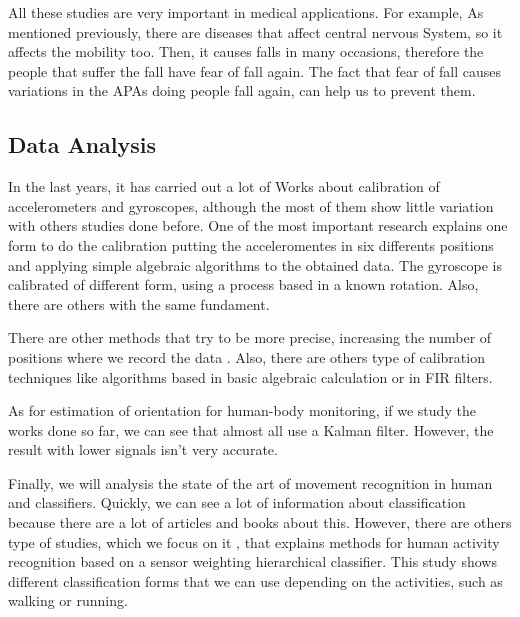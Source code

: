 All these studies are very important in medical applications. For example, As mentioned previously, there are diseases that affect central nervous System, so it affects  the mobility too. Then, it causes falls in many occasions, therefore  the people that suffer the fall have fear of fall again. The fact that fear of fall causes variations in the APAs doing people  fall again, can help us to prevent them.

\subsection{Data Analysis}

In the last years, it has carried out a lot of Works about  calibration of accelerometers and gyroscopes, although the most of them show little variation with others studies done before. One of the most important research  \cite{Kian2011}explains one form to do the calibration putting the acceleromentes in six differents positions and applying  simple algebraic algorithms to the obtained data. The gyroscope is calibrated of different form, using a process based in a known rotation. Also, there are others with the same fundament.

There are other methods that try to be more precise, increasing the number of positions where we record the data \cite{Camps2009}. Also, there are others type of calibration techniques like algorithms based in basic algebraic calculation or in FIR filters. \cite{A.Olivares2013}

As for estimation of orientation for human-body monitoring, if we study the works done so far, we can see that almost all  use a Kalman filter. However, the result with lower signals isn’t very accurate.\cite{A.Olivares2013}

Finally, we will analysis the state of the art of movement recognition in human and classifiers. Quickly, we can see a lot of information about classification because there are a lot of articles and books about this. However, there are others type of studies, which we focus on  it \cite{Banos2012}, that explains methods for human activity recognition based on a sensor weighting hierarchical classifier. This study shows different classification forms that we can use depending on the activities, such as walking or running.

